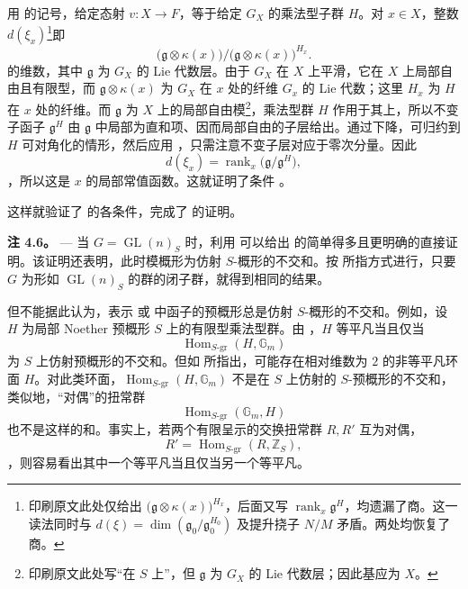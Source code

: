 用  的记号，给定态射 \(v\colon
X\to F\)，等于给定 \(G_X\) 的乘法型子群 \(H\)。对 \(x\in X\)，整数 \(d(\xi_x)\)\footnote{印刷原文此处仅给出 \(\bigl(\mathfrak g\otimes\kappa(x)\bigr)^{H_x}\)，后面又写 \(\operatorname{rank}_x\mathfrak g^H\)，均遗漏了商。这一读法同时与  \(d(\xi)=\dim(\mathfrak g_0/\mathfrak g_0^{H_0})\) 及提升挠子 \(N/M\) 矛盾。两处均恢复了商。}即  \[
  \bigl(\mathfrak g\otimes\kappa(x)\bigr)
  \big/
  \bigl(\mathfrak g\otimes\kappa(x)\bigr)^{H_x}.
\] 的维数，其中 \(\mathfrak g\) 为 \(G_X\) 的 Lie 代数层。由于 \(G_X\) 在 \(X\) 上平滑，它在 \(X\) 上局部自由且有限型，而 \(\mathfrak g\otimes\kappa(x)\) 为 \(G_X\) 在 \(x\) 处的纤维 \(G_x\) 的 Lie 代数；这里 \(H_x\) 为 \(H\) 在 \(x\) 处的纤维。而 \(\mathfrak g\) 为 \(X\) 上的局部自由模\footnote{印刷原文此处写“在 \(S\) 上”，但 \(\mathfrak g\) 为 \(G_X\) 的 Lie 代数层；因此基应为 \(X\)。}，乘法型群 \(H\) 作用于其上，所以不变子函子 \(\mathfrak g^H\) 由 \(\mathfrak g\) 中局部为直和项、因而局部自由的子层给出。通过下降，可归约到 \(H\) 可对角化的情形，然后应用 ，只需注意不变子层对应于零次分量。因此 \[
  d(\xi_x)=\operatorname{rank}_x
  \bigl(\mathfrak g/\mathfrak g^H\bigr),
\]，所以这是 \(x\) 的局部常值函数。这就证明了条件 。

这样就验证了  的各条件，完成了  的证明。

\medskip\noindent{}\textbf{注 4.6。} --- 当 \(G=\operatorname{GL}(n)_S\) 时，利用  可以给出  的简单得多且更明确的直接证明。该证明还表明，此时模概形为仿射 \(S\)-概形的不交和。按  所指方式进行，只要 \(G\) 为形如 \(\operatorname{GL}(n)_S\) 的群的闭子群，就得到相同的结果。

但不能据此认为，表示  或  中函子的预概形总是仿射 \(S\)-概形的不交和。例如，设 \(H\) 为局部 Noether 预概形 \(S\) 上的有限型乘法型群。由 ，\(H\) 等平凡当且仅当 \[
  \operatorname{Hom}_{S\text{-}\mathrm{gr}}(H,\mathbb G_m)
\] 为 \(S\) 上仿射预概形的不交和。但如  所指出，可能存在相对维数为 \(2\) 的非等平凡环面 \(H\)。对此类环面，\(\operatorname{Hom}_{S\text{-}\mathrm{gr}}(H,\mathbb G_m)\) 不是在 \(S\) 上仿射的 \(S\)-预概形的不交和，类似地，“对偶”的扭常群 \[
  \operatorname{Hom}_{S\text{-}\mathrm{gr}}(\mathbb G_m,H)
\] 也不是这样的和。事实上，若两个有限呈示的交换扭常群 \(R,R'\) 互为对偶，\[
  R'=\operatorname{Hom}_{S\text{-}\mathrm{gr}}(R,\mathbb Z_S),
\]，则容易看出其中一个等平凡当且仅当另一个等平凡。

